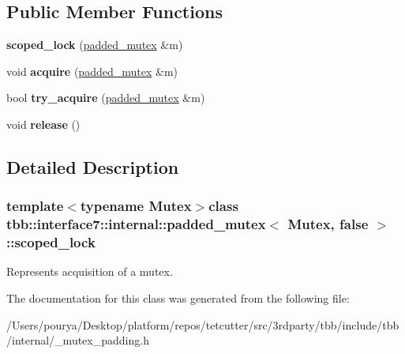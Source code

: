 \subsection*{Public Member Functions}
\begin{DoxyCompactItemize}
\item 
\hypertarget{classtbb_1_1interface7_1_1internal_1_1padded__mutex_3_01Mutex_00_01false_01_4_1_1scoped__lock_a906e735ba1790198080a87279393e5f5}{}{\bfseries scoped\+\_\+lock} (\hyperlink{classtbb_1_1interface7_1_1internal_1_1padded__mutex}{padded\+\_\+mutex} \&m)\label{classtbb_1_1interface7_1_1internal_1_1padded__mutex_3_01Mutex_00_01false_01_4_1_1scoped__lock_a906e735ba1790198080a87279393e5f5}

\item 
\hypertarget{classtbb_1_1interface7_1_1internal_1_1padded__mutex_3_01Mutex_00_01false_01_4_1_1scoped__lock_a3abfca30f92573bc4c2fe838377d0a85}{}void {\bfseries acquire} (\hyperlink{classtbb_1_1interface7_1_1internal_1_1padded__mutex}{padded\+\_\+mutex} \&m)\label{classtbb_1_1interface7_1_1internal_1_1padded__mutex_3_01Mutex_00_01false_01_4_1_1scoped__lock_a3abfca30f92573bc4c2fe838377d0a85}

\item 
\hypertarget{classtbb_1_1interface7_1_1internal_1_1padded__mutex_3_01Mutex_00_01false_01_4_1_1scoped__lock_a13475b6862b76112bc590f82ade28cbd}{}bool {\bfseries try\+\_\+acquire} (\hyperlink{classtbb_1_1interface7_1_1internal_1_1padded__mutex}{padded\+\_\+mutex} \&m)\label{classtbb_1_1interface7_1_1internal_1_1padded__mutex_3_01Mutex_00_01false_01_4_1_1scoped__lock_a13475b6862b76112bc590f82ade28cbd}

\item 
\hypertarget{classtbb_1_1interface7_1_1internal_1_1padded__mutex_3_01Mutex_00_01false_01_4_1_1scoped__lock_a922548b4708b250e54b3acbd01a956d9}{}void {\bfseries release} ()\label{classtbb_1_1interface7_1_1internal_1_1padded__mutex_3_01Mutex_00_01false_01_4_1_1scoped__lock_a922548b4708b250e54b3acbd01a956d9}

\end{DoxyCompactItemize}


\subsection{Detailed Description}
\subsubsection*{template$<$typename Mutex$>$class tbb\+::interface7\+::internal\+::padded\+\_\+mutex$<$ Mutex, false $>$\+::scoped\+\_\+lock}

Represents acquisition of a mutex. 

The documentation for this class was generated from the following file\+:\begin{DoxyCompactItemize}
\item 
/\+Users/pourya/\+Desktop/platform/repos/tetcutter/src/3rdparty/tbb/include/tbb/internal/\+\_\+mutex\+\_\+padding.\+h\end{DoxyCompactItemize}
